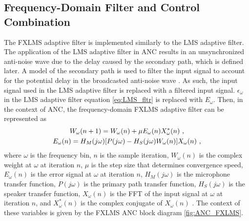 \documentclass[11pt]{article}
\begin{document}
\subsection{Frequency-Domain Filter and Control Combination}

The FXLMS adaptive filter is implemented similarly to the LMS adaptive filter. The application of the LMS adaptive filter in ANC results in an unsynchronized anti-noise wave due to the delay caused by the secondary path, which is defined later. A model of the secondary path is used to filter the input signal to account for the potential delay in the broadcasted anti-noise wave \cite{kuo}. As such, the input signal used in the LMS adaptive filter is replaced with a filtered input signal. $\epsilon_\omega$ in the LMS adaptive filter equation \eqref{eq:LMS_fltr} is replaced with $E_\omega$. Then, in the context of ANC, the frequency-domain FXLMS adaptive filter can be represented as
\begin{gather}
    W_\omega(n+1) = W_\omega(n) + \mu E_\omega(n) X_\omega^*(n) \text{ ,}\\
    E_\omega(n) = H_M(j \omega) [P(j \omega) - H_S(j \omega) W_\omega(n)] X_\omega(n) \text{ ,}
\end{gather}
where $\omega$ is the frequency bin, $n$ is the sample iteration, $W_\omega(n)$ is the complex weight at $\omega$ at iteration $n$, $\mu$ is the step size that determines convergence speed, $E_\omega(n)$ is the error signal at $\omega$ at iteration $n$, $H_M(j \omega)$ is the microphone transfer function, $P(j \omega)$ is the primary path transfer function, $H_S(j \omega)$ is the speaker transfer function, $X_\omega(n)$ is the FFT of the input signal at $\omega$ at iteration $n$, and $X_\omega^*(n)$ is the complex conjugate of $X_\omega(n)$ \cite{feintuch}. The context of these variables is given by the FXLMS ANC block diagram \cref{fig:ANC_FXLMS}.
\end{document}

